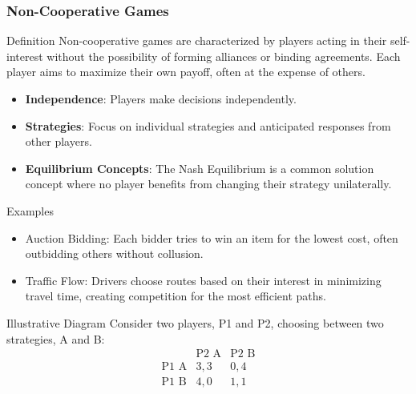 \documentclass[aspectratio=169]{beamer}
\begin{document}
\begin{frame}[fragile]
    \frametitle{Non-Cooperative Games}
    
    \begin{block}{Definition}
        Non-cooperative games are characterized by players acting in their self-interest without the possibility of forming alliances or binding agreements. Each player aims to maximize their own payoff, often at the expense of others.
    \end{block}

    \begin{itemize}
        \item \textbf{Independence}: Players make decisions independently.
        \item \textbf{Strategies}: Focus on individual strategies and anticipated responses from other players.
        \item \textbf{Equilibrium Concepts}: The Nash Equilibrium is a common solution concept where no player benefits from changing their strategy unilaterally.
    \end{itemize}

    \begin{block}{Examples}
        \begin{itemize}
            \item Auction Bidding: Each bidder tries to win an item for the lowest cost, often outbidding others without collusion.
            \item Traffic Flow: Drivers choose routes based on their interest in minimizing travel time, creating competition for the most efficient paths.
        \end{itemize}
    \end{block}

    \begin{block}{Illustrative Diagram}
        Consider two players, P1 and P2, choosing between two strategies, A and B:
        \begin{equation}
        \begin{array}{c|c|c}
            & \text{P2 A} & \text{P2 B} \\
            \hline
            \text{P1 A} & 3, 3 & 0, 4 \\
            \text{P1 B} & 4, 0 & 1, 1 
        \end{array}
        \end{equation}
    \end{block}
\end{frame}
\end{document}

